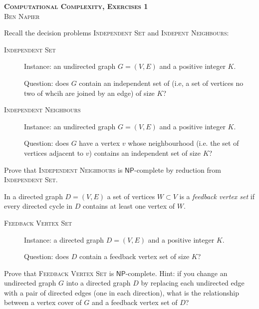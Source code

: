 \documentclass[a4paper, answers]{exam}
\begin{document}
\begin{center}
	\textbf{\textsc{Computational Complexity, Exercises 1}} \\
	\textsc{Ben Napier}
	\vspace{1em}
\end{center}

\vspace{1em}

\begin{questions}
	\question Recall the decision problems \textsc{Independent Set} and
	\textsc{Indepent Neighbours}:
	\begin{description}
		\item[\textsc{Independent Set}] \hfill

		Instance: an undirected graph $G = (V,E)$
		and a positive integer $K$.

		Question: does $G$ contain an independent set of (i.e, a set of
		vertices no two of whcih are joined by an edge) of size $K$?

		\item[\textsc{Independent Neighbours}] \hfill

		Instance: an undirected graph $G = (V,E)$ and a positive integer $K$.
		
		Question: does $G$ have a vertex $v$ whose neighbourhood (i.e. the 
		set of vertices adjacent to $v$) contains an independent set of size
		$K$?
	\end{description}
	Prove that \textsc{Independent Neighbours} is $\mathsf{NP}$-complete by 
	reduction from \textsc{Independent Set}.

	\question In a directed graph $D = (V,E)$ a set of vertices $W \subset V$ 
	is a \emph{feedback vertex set} if every directed cycle in $D$ contains
	at least one vertex of $W$.
	\begin{description}
		\item[\textsc{Feedback Vertex Set}] \hfill

		Instance: a directed graph $D = (V,E)$ and a positive integer $K$.
		
		Question: does $D$ contain a feedback vertex set of size $K$?
	\end{description}
	Prove that \textsc{Feedback Vertex Set} is $\mathsf{NP}$-complete.
	Hint: if you change an undirected graph $G$ into a directed graph $D$ by
	replacing each undirected edge with a pair of directed edges (one in each
	direction), what is the relationship between a vertex cover of $G$ and a
	feedback vertex set of $D$?


\end{questions}
\end{document}
